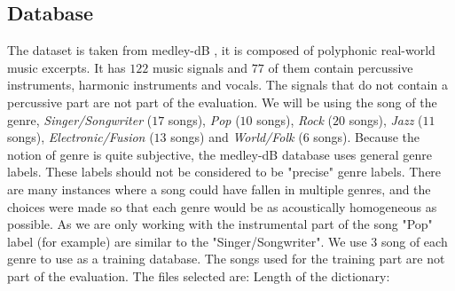 \documentclass{article}
\begin{document}
\subsection{Database}\label{database}

The dataset is taken from medley-dB \cite{bittner2014medleydb}, it is composed of polyphonic real-world music excerpts. It has $122$ music signals and $77$ of them contain percussive instruments, harmonic instruments and vocals. The signals that do not contain a percussive part are not part of the evaluation. We will be using the song of the genre, \emph{Singer/Songwriter} ($17$ songs), \emph{Pop} ($10$ songs), \emph{Rock} ($20$ songs), \emph{Jazz} ($11$ songs), \emph{Electronic/Fusion} ($13$ songs) and \emph{World/Folk} ($6$ songs). Because the notion of genre is quite subjective, the medley-dB database uses general genre labels. These labels should not be considered to be "precise" genre labels. There are many instances where a song could have fallen in multiple genres, and the choices were made so that each genre would be as acoustically homogeneous as possible. As we are only working with the instrumental part of the song "Pop" label (for example) are similar to the "Singer/Songwriter".
We use $3$ song of each genre to use as a training database. The songs used for the training part are not part of the evaluation. The files selected are:
Length of the dictionary: 
\end{document}
